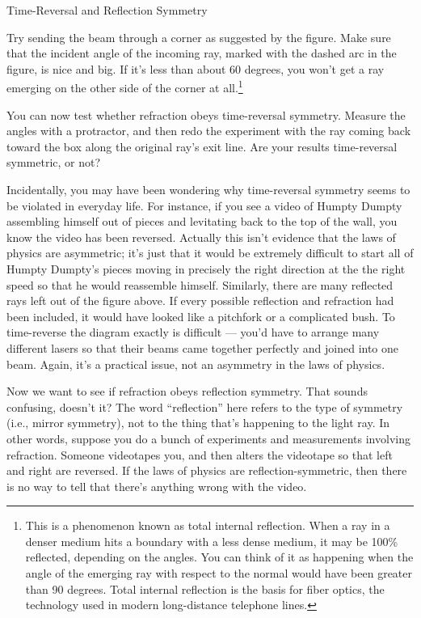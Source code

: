 \begin{lab}{Time-Reversal and Reflection Sym\-met\-ry}

Try sending the beam through a corner as suggested by the figure. Make sure that the incident
angle of the incoming ray, marked with the dashed arc in the figure, is nice and big. If it's
less than about 60 degrees, you won't get a ray
emerging on the other side of the corner at all.\footnote{This is a phenomenon known as total
internal reflection.
When a ray in a denser medium hits a boundary with a less dense medium,
it may be 100\% reflected, depending on the angles. You can think of it as happening when the
angle of the emerging ray with respect to the normal would have been greater than 90 degrees.
Total internal reflection is the basis for fiber optics, the technology used in modern long-distance
telephone lines.}


You can now test whether refraction
obeys time-reversal symmetry. Measure the angles with a protractor, and then redo the experiment with
the ray coming back toward the box along the original ray's exit line. Are your results time-reversal
symmetric, or not?

Incidentally, you may have been wondering why time-reversal symmetry seems to be violated in everyday life.
For instance, if you see a video of Humpty Dumpty assembling himself out of pieces and levitating back
to the top of the wall, you know the video has been reversed. Actually this isn't evidence that the laws
of physics are asymmetric; it's just that it would be extremely difficult to start all of Humpty Dumpty's
pieces moving in precisely the right direction at the the right speed so that he would reassemble himself.
Similarly, there are many reflected rays left out of the figure above. If every possible reflection and
refraction had been included, it would have looked like a pitchfork or a complicated bush. To time-reverse
the diagram exactly is difficult --- you'd have to arrange many different lasers so that their beams came
together perfectly and joined into one beam. Again, it's a practical issue, not an asymmetry in the
laws of physics.


Now we want to see if refraction obeys reflection symmetry.
That sounds confusing, doesn't it? 
The word ``reflection'' here refers to the type of symmetry (i.e., mirror symmetry), not to
the thing that's happening to the light ray.
In other words, suppose you
do a bunch of experiments and measurements involving refraction. Someone videotapes you, and then alters
the videotape so that left and right are reversed. If the laws of physics are
reflection-symmetric, then there is no way to tell that there's anything wrong with the video.


\end{lab}
